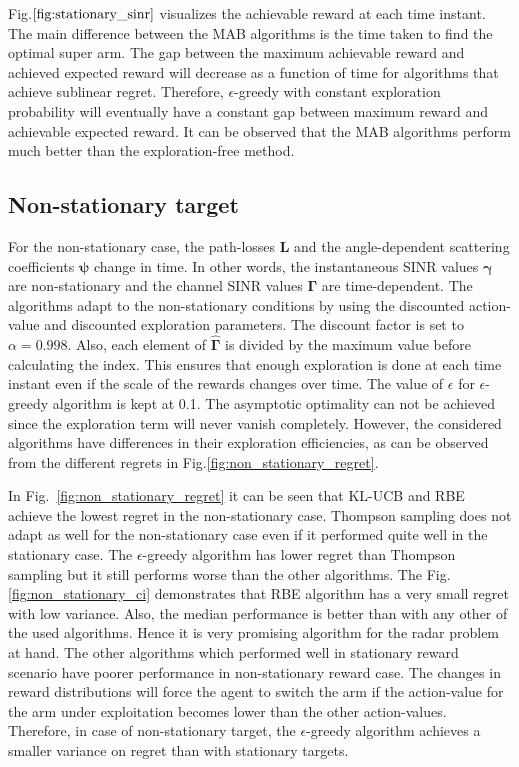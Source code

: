 \documentclass[conference]{IEEEtran}
\newcommand{\vsinr}{\boldsymbol{\gamma}}
\newcommand{\vsinrexp}{\boldsymbol{\Gamma}}
\newcommand{\vsinrb}{\widehat{\boldsymbol{\Gamma}}}
\newcommand{\vpl}{\boldsymbol{L}}
\newcommand{\vrcs}{\boldsymbol{\psi}}
\begin{document}
Fig.$\ref{fig:stationary_sinr}$ visualizes the achievable reward at each time instant.
The main difference between the MAB algorithms is the time taken to find the optimal super arm.
The gap between the maximum achievable reward and achieved expected reward will decrease as a function of time for algorithms that achieve sublinear regret.
Therefore, $\epsilon$-greedy with constant exploration probability will eventually have a constant gap between maximum reward and achievable expected reward.
It can be observed that the MAB algorithms perform much better than the exploration-free method.

\subsection{Non-stationary target}


For the non-stationary case, the path-losses $\vpl$ and the angle-dependent scattering coefficients $\vrcs$ change in time.
In other words, the instantaneous SINR values $\vsinr$ are non-stationary and the channel SINR values $\vsinrexp$ are time-dependent.
The algorithms adapt to the non-stationary conditions by using the discounted action-value and discounted exploration parameters.
The discount factor is set to $\alpha = 0.998$.
Also, each element of $\vsinrb$ is divided by the maximum value before calculating the index.
This ensures that enough exploration is done at each time instant even if the scale of the rewards changes over time.
The value of $\epsilon$ for $\epsilon$-greedy algorithm is kept at 0.1.
The asymptotic optimality can not be achieved since the exploration term will never vanish completely.
However, the considered algorithms have differences in their exploration efficiencies, as can be observed from the different regrets in Fig.\ref{fig:non_stationary_regret}.

In Fig.~\ref{fig:non_stationary_regret} it can be seen that KL-UCB and RBE achieve the lowest regret in the non-stationary case.
Thompson sampling does not adapt as well for the non-stationary case even if it performed quite well in the stationary case.
The $\epsilon$-greedy algorithm has lower regret than Thompson sampling but it still performs worse than the other algorithms. 
The Fig.\ref{fig:non_stationary_ci} demonstrates that RBE algorithm has a very small regret with low variance.
Also, the median performance is better than with any other of the used algorithms.
Hence it is very promising algorithm for the radar problem at hand. 
The other algorithms which performed well in stationary reward scenario have poorer performance in non-stationary reward case.
The changes in reward distributions will force the agent to switch the arm if the action-value for the arm under exploitation becomes lower than the other action-values.
Therefore, in case of non-stationary target, the $\epsilon$-greedy algorithm achieves a smaller variance on regret than with stationary targets.
\end{document}
